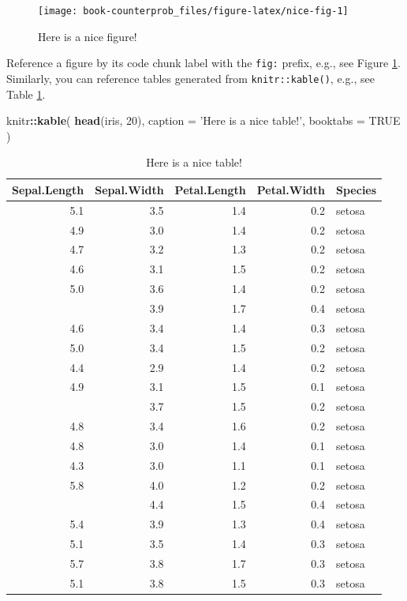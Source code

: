 \documentclass[
  b5paper,
]{scrbook}
\newenvironment{Shaded}{\begin{snugshade}}{\end{snugshade}}
\newcommand{\DataTypeTok}[1]{\textcolor[rgb]{0.13,0.29,0.53}{#1}}
\newcommand{\DecValTok}[1]{\textcolor[rgb]{0.00,0.00,0.81}{#1}}
\newcommand{\KeywordTok}[1]{\textcolor[rgb]{0.13,0.29,0.53}{\textbf{#1}}}
\newcommand{\NormalTok}[1]{#1}
\newcommand{\OperatorTok}[1]{\textcolor[rgb]{0.81,0.36,0.00}{\textbf{#1}}}
\newcommand{\OtherTok}[1]{\textcolor[rgb]{0.56,0.35,0.01}{#1}}
\newcommand{\StringTok}[1]{\textcolor[rgb]{0.31,0.60,0.02}{#1}}
\theoremstyle{definition}
\theoremstyle{definition}
\theoremstyle{definition}
\theoremstyle{remark}
\begin{document}
\begin{figure}

{\centering \texttt{[image: book-counterprob\_files/figure-latex/nice-fig-1]} 

}

\caption{Here is a nice figure!}\label{fig:nice-fig}
\end{figure}

Reference a figure by its code chunk label with the \texttt{fig:} prefix, e.g., see Figure \ref{fig:nice-fig}. Similarly, you can reference tables generated from \texttt{knitr::kable()}, e.g., see Table \ref{tab:nice-tab}.

\begin{Shaded}
\begin{Highlighting}[]
\NormalTok{knitr}\OperatorTok{::}\KeywordTok{kable}\NormalTok{(}
  \KeywordTok{head}\NormalTok{(iris, }\DecValTok{20}\NormalTok{), }\DataTypeTok{caption =} \StringTok{'Here is a nice table!'}\NormalTok{,}
  \DataTypeTok{booktabs =} \OtherTok{TRUE}
\NormalTok{)}
\end{Highlighting}
\end{Shaded}

\begin{table}[t]

\caption{\label{tab:nice-tab}Here is a nice table!}
\centering
\begin{tabular}{rrrrl}
\toprule
Sepal.Length & Sepal.Width & Petal.Length & Petal.Width & Species\\
\midrule
5.1 & 3.5 & 1.4 & 0.2 & setosa\\
4.9 & 3.0 & 1.4 & 0.2 & setosa\\
4.7 & 3.2 & 1.3 & 0.2 & setosa\\
4.6 & 3.1 & 1.5 & 0.2 & setosa\\
5.0 & 3.6 & 1.4 & 0.2 & setosa\\
\addlinespace
5.4 & 3.9 & 1.7 & 0.4 & setosa\\
4.6 & 3.4 & 1.4 & 0.3 & setosa\\
5.0 & 3.4 & 1.5 & 0.2 & setosa\\
4.4 & 2.9 & 1.4 & 0.2 & setosa\\
4.9 & 3.1 & 1.5 & 0.1 & setosa\\
\addlinespace
5.4 & 3.7 & 1.5 & 0.2 & setosa\\
4.8 & 3.4 & 1.6 & 0.2 & setosa\\
4.8 & 3.0 & 1.4 & 0.1 & setosa\\
4.3 & 3.0 & 1.1 & 0.1 & setosa\\
5.8 & 4.0 & 1.2 & 0.2 & setosa\\
\addlinespace
5.7 & 4.4 & 1.5 & 0.4 & setosa\\
5.4 & 3.9 & 1.3 & 0.4 & setosa\\
5.1 & 3.5 & 1.4 & 0.3 & setosa\\
5.7 & 3.8 & 1.7 & 0.3 & setosa\\
5.1 & 3.8 & 1.5 & 0.3 & setosa\\
\bottomrule
\end{tabular}
\end{table}
\end{document}
